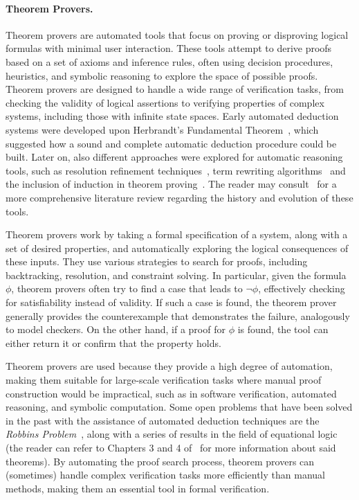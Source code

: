 \paragraph{\textbf{Theorem Provers}.} Theorem provers are automated tools that focus on proving or disproving logical formulas with minimal user interaction. These tools attempt to derive proofs based on a set of axioms and inference rules, often using decision procedures, heuristics, and symbolic reasoning to explore the space of possible proofs. Theorem provers are designed to handle a wide range of verification tasks, from checking the validity of logical assertions to verifying properties of complex systems, including those with infinite state spaces. Early automated deduction systems were developed upon Herbrandt's Fundamental Theorem~\cite{herbrandtheorem}, which suggested how a sound and complete automatic deduction procedure could be built. Later on, also different approaches were explored for automatic reasoning tools, such as resolution refinement techniques~\cite{lovelandautomatic}, term rewriting algorithms~\cite{equationsandrr} and the inclusion of induction in theorem proving~\cite{combininginduction}. The reader may consult~\cite{surveyautomated} for a more comprehensive literature review regarding the history and evolution of these tools.

Theorem provers work by taking a formal specification of a system, along with a set of desired properties, and automatically exploring the logical consequences of these inputs. They use various strategies to search for proofs, including backtracking, resolution, and constraint solving. In particular, given the formula $\phi$, theorem provers often try to find a case that leads to $\neg \phi$, effectively checking for satisfiability instead of validity. If such a case is found, 
the theorem prover generally provides the counterexample that demonstrates the failure, analogously to model checkers. On the other hand, if a proof for $\phi$ is found, the tool can either return it or confirm that the property holds.

Theorem provers are used because they provide a high degree of automation, making them suitable for large-scale verification tasks where manual proof construction would be impractical, such as in software verification, automated reasoning, and symbolic computation. Some open problems that have been solved in the past with the assistance of automated deduction techniques are the \textit{Robbins Problem}~\cite{robbinsproblem}, along with a series of results in the field of equational logic (the reader can refer to Chapters 3 and 4 of~\cite{adequationallogic} for more information about said theorems). By automating the proof search process, theorem provers can (sometimes) handle complex verification tasks more efficiently than manual methods, making them an essential tool in formal verification.

